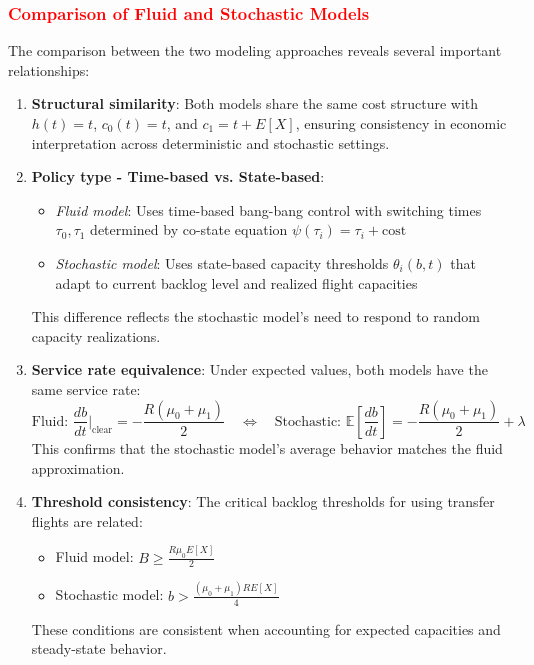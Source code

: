 \documentclass[opre,sglanonrev]{informs4}
\begin{document}
\subsubsection{\textcolor{red}{Comparison of Fluid and Stochastic Models}}

{\color{brown}
The comparison between the two modeling approaches reveals several important relationships:

\begin{enumerate}
    \item \textbf{Structural similarity}: Both models share the same cost structure with \( h(t) = t \), \( c_0(t) = t \), and \( c_1 = t + E[X] \), ensuring consistency in economic interpretation across deterministic and stochastic settings.
    
    \item \textbf{Policy type - Time-based vs. State-based}: 
    \begin{itemize}
        \item \textit{Fluid model}: Uses time-based bang-bang control with switching times \( \tau_0, \tau_1 \) determined by co-state equation \( \psi(\tau_i) = \tau_i + \text{cost} \)
        \item \textit{Stochastic model}: Uses state-based capacity thresholds \( \theta_i(b, t) \) that adapt to current backlog level and realized flight capacities
    \end{itemize}
    This difference reflects the stochastic model's need to respond to random capacity realizations.
    
    \item \textbf{Service rate equivalence}: Under expected values, both models have the same service rate:
    \[
    \text{Fluid: } \frac{db}{dt}\bigg|_{\text{clear}} = -\frac{R(\mu_0 + \mu_1)}{2} \quad \Leftrightarrow \quad \text{Stochastic: } \mathbb{E}\left[\frac{db}{dt}\right] = -\frac{R(\mu_0 + \mu_1)}{2} + \lambda
    \]
    This confirms that the stochastic model's average behavior matches the fluid approximation.
    
    \item \textbf{Threshold consistency}: The critical backlog thresholds for using transfer flights are related:
    \begin{itemize}
        \item Fluid model: \( B \geq \frac{R\mu_0 E[X]}{2} \)
        \item Stochastic model: \( b > \frac{(\mu_0 + \mu_1) R E[X]}{4} \)
    \end{itemize}
    These conditions are consistent when accounting for expected capacities and steady-state behavior.
    

\end{enumerate}}
\end{document}

